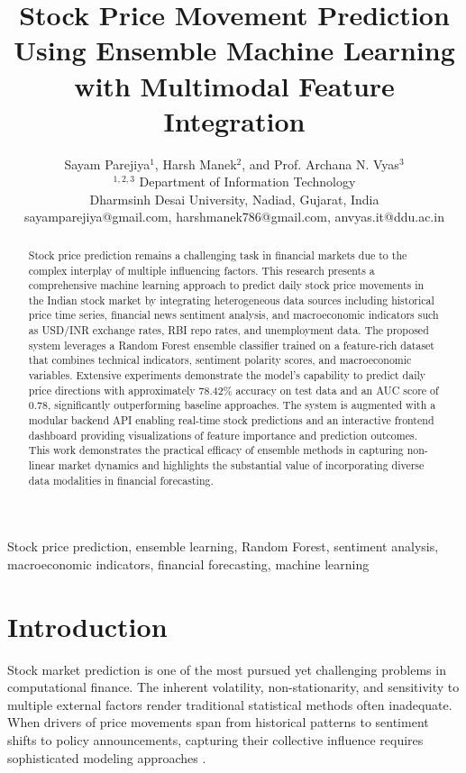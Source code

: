 \documentclass[conference]{IEEEtran}
\title{Stock Price Movement Prediction Using Ensemble Machine Learning with Multimodal Feature Integration}
\author{
Sayam Parejiya$^{1}$, Harsh Manek$^{2}$, and Prof. Archana N. Vyas$^{3}$\\
$^{1,2,3}$ Department of Information Technology\\
Dharmsinh Desai University, Nadiad, Gujarat, India\\
sayamparejiya@gmail.com, harshmanek786@gmail.com, anvyas.it@ddu.ac.in
}
\begin{document}
\maketitle

\begin{abstract}
Stock price prediction remains a challenging task in financial markets due to the complex interplay of multiple influencing factors. This research presents a comprehensive machine learning approach to predict daily stock price movements in the Indian stock market by integrating heterogeneous data sources including historical price time series, financial news sentiment analysis, and macroeconomic indicators such as USD/INR exchange rates, RBI repo rates, and unemployment data. The proposed system leverages a Random Forest ensemble classifier trained on a feature-rich dataset that combines technical indicators, sentiment polarity scores, and macroeconomic variables. Extensive experiments demonstrate the model's capability to predict daily price directions with approximately 78.42\% accuracy on test data and an AUC score of 0.78, significantly outperforming baseline approaches. The system is augmented with a modular backend API enabling real-time stock predictions and an interactive frontend dashboard providing visualizations of feature importance and prediction outcomes. This work demonstrates the practical efficacy of ensemble methods in capturing non-linear market dynamics and highlights the substantial value of incorporating diverse data modalities in financial forecasting.
\end{abstract}

\begin{IEEEkeywords}
Stock price prediction, ensemble learning, Random Forest, sentiment analysis, macroeconomic indicators, financial forecasting, machine learning
\end{IEEEkeywords}

\section{Introduction}

Stock market prediction is one of the most pursued yet challenging problems in computational finance. The inherent volatility, non-stationarity, and sensitivity to multiple external factors render traditional statistical methods often inadequate. When drivers of price movements span from historical patterns to sentiment shifts to policy announcements, capturing their collective influence requires sophisticated modeling approaches \cite{patel2015predicting, fischer2018deep}.
\end{document}
